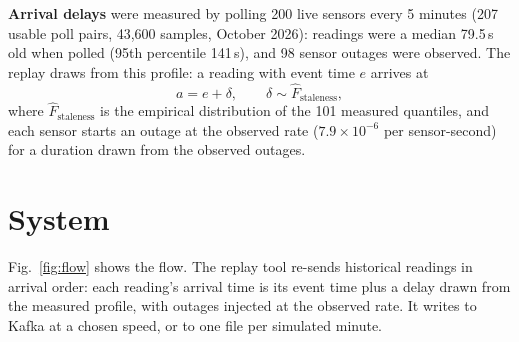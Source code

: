\documentclass[10pt,journal,compsoc]{IEEEtran}
\begin{document}
\textbf{Arrival delays} were measured by polling 200 live sensors every 5 minutes (207 usable poll pairs, 43,600 samples, October 2026): readings were a median 79.5\,s old when polled (95th percentile 141\,s), and 98 sensor outages were observed. The replay draws from this profile: a reading with event time $e$ arrives at
\begin{equation}
a = e + \delta, \qquad \delta \sim \hat F_{\text{staleness}},
\end{equation}
where $\hat F_{\text{staleness}}$ is the empirical distribution of the 101 measured quantiles, and each sensor starts an outage at the observed rate ($7.9\times10^{-6}$ per sensor-second) for a duration drawn from the observed outages.

\section{System}
Fig.~\ref{fig:flow} shows the flow. The replay tool re-sends historical readings in arrival order: each reading's arrival time is its event time plus a delay drawn from the measured profile, with outages injected at the observed rate. It writes to Kafka at a chosen speed, or to one file per simulated minute.
\end{document}
